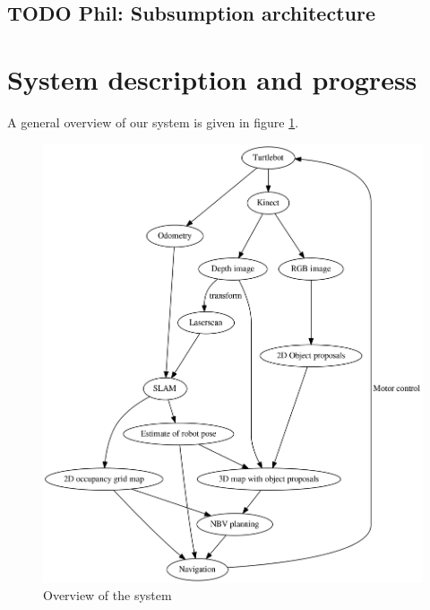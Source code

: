 \documentclass[a4paper,11pt,english]{article}
\begin{document}
\subsection{TODO Phil: Subsumption architecture}
\label{background:subsumption}

\section{System description and progress}
\label{system}
A general overview of our system is given in figure \ref{fig:overview}.

\begin{figure}
	\begin{center}
		\includegraphics[width=1\linewidth]{dot/overview.png} 
		\caption{Overview of the system}
		\label{fig:overview}
	\end{center}
\end{figure}
\end{document}
